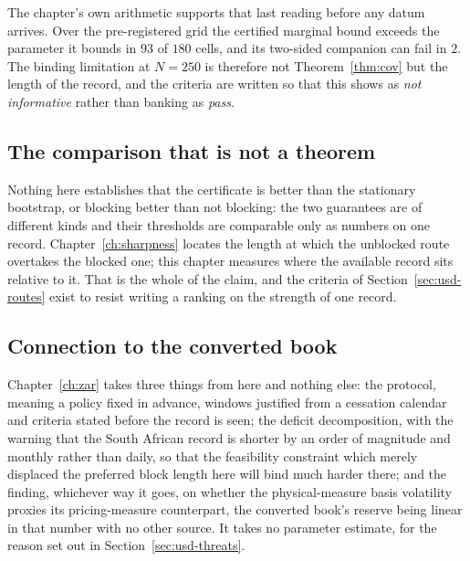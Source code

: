 \documentclass[../../../main.tex]{subfiles}
\begin{document}
The chapter's own arithmetic supports that last reading before any datum arrives. Over the pre-registered grid the certified marginal bound exceeds the parameter it bounds in $93$ of $180$ cells, and its two-sided companion can fail in $2$. The binding limitation at $N=250$ is therefore not Theorem~\ref{thm:cov} but the length of the record, and the criteria are written so that this shows as \emph{not informative} rather than banking as \emph{pass}.

\subsection{The comparison that is not a theorem}

Nothing here establishes that the certificate is better than the stationary bootstrap, or blocking better than not blocking: the two guarantees are of different kinds and their thresholds are comparable only as numbers on one record. Chapter~\ref{ch:sharpness} locates the length at which the unblocked route overtakes the blocked one; this chapter measures where the available record sits relative to it. That is the whole of the claim, and the criteria of Section~\ref{sec:usd-routes} exist to resist writing a ranking on the strength of one record.

\subsection{Connection to the converted book}

Chapter~\ref{ch:zar} takes three things from here and nothing else: the protocol, meaning a policy fixed in advance, windows justified from a cessation calendar and criteria stated before the record is seen; the deficit decomposition, with the warning that the South African record is shorter by an order of magnitude and monthly rather than daily, so that the feasibility constraint which merely displaced the preferred block length here will bind much harder there; and the finding, whichever way it goes, on whether the physical-measure basis volatility proxies its pricing-measure counterpart, the converted book's reserve being linear in that number with no other source. It takes no parameter estimate, for the reason set out in Section~\ref{sec:usd-threats}.
\end{document}
